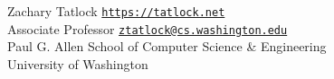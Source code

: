 \documentclass[11pt,letterpaper]{article}
\makeatletter
\newcommand{\cvWebsite}[0]{https://tatlock.net}
\newcommand{\cvEmail}[0]{ztatlock@cs.washington.edu}
\newcommand{\cvSection}[1]{\vspace{1em}{\Large #1}}
\makeatother
\begin{document}
{\LARGE Zachary Tatlock} \hfill
  \href{\cvWebsite}{\texttt{\cvWebsite}} \\[0.25em]
Associate Professor \hfill
  \href{mailto:\cvEmail}{\texttt{\cvEmail}} \\
Paul G. Allen School of Computer Science \& Engineering \\
University of Washington

\cvSection{Education}

\cvSection{Experience}

\cvSection{Students}

\cvSection{Publications}

\cvSection{Teaching}
\end{document}
